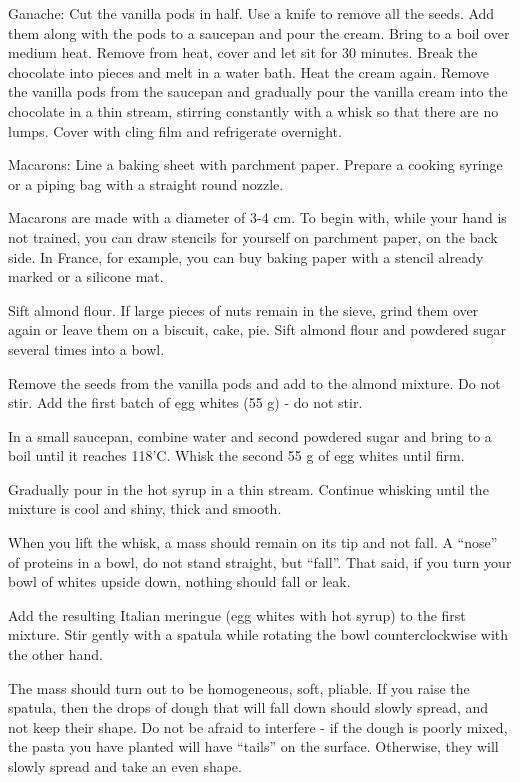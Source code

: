 \documentclass[
]{book}
\begin{document}
Ganache:
Cut the vanilla pods in half. Use a knife to remove all the seeds. Add them along with the pods to a saucepan and pour the cream.
Bring to a boil over medium heat. Remove from heat, cover and let sit for 30 minutes.
Break the chocolate into pieces and melt in a water bath.
Heat the cream again. Remove the vanilla pods from the saucepan and gradually pour the vanilla cream into the chocolate in a thin stream, stirring constantly with a whisk so that there are no lumps.
Cover with cling film and refrigerate overnight.

Macarons:
Line a baking sheet with parchment paper. Prepare a cooking syringe or a piping bag with a straight round nozzle.

Macarons are made with a diameter of 3-4 cm. To begin with, while your hand is not trained, you can draw stencils for yourself on parchment paper, on the back side. In France, for example, you can buy baking paper with a stencil already marked or a silicone mat.

Sift almond flour. If large pieces of nuts remain in the sieve, grind them over again or leave them on a biscuit, cake, pie.
Sift almond flour and powdered sugar several times into a bowl.

Remove the seeds from the vanilla pods and add to the almond mixture. Do not stir. Add the first batch of egg whites (55 g) - do not stir.

In a small saucepan, combine water and second powdered sugar and bring to a boil until it reaches 118'C.
Whisk the second 55 g of egg whites until firm.

Gradually pour in the hot syrup in a thin stream. Continue whisking until the mixture is cool and shiny, thick and smooth.

When you lift the whisk, a mass should remain on its tip and not fall. A ``nose'' of proteins in a bowl, do not stand straight, but ``fall''. That said, if you turn your bowl of whites upside down, nothing should fall or leak.

Add the resulting Italian meringue (egg whites with hot syrup) to the first mixture.
Stir gently with a spatula while rotating the bowl counterclockwise with the other hand.

The mass should turn out to be homogeneous, soft, pliable. If you raise the spatula, then the drops of dough that will fall down should slowly spread, and not keep their shape. Do not be afraid to interfere - if the dough is poorly mixed, the pasta you have planted will have ``tails'' on the surface. Otherwise, they will slowly spread and take an even shape.
\end{document}
